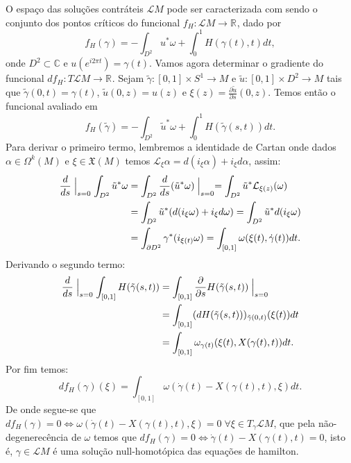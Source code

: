 \documentclass[12pt]{book}
\newcommand{\derivadaparcial}[2]{\frac{\partial #1}{\partial #2}}
\newcommand{\real}[1]{\mathbb{R}^{#1}}
\newcommand{\solucoesperiodicascontrateis}{\mathcal{L}M}
\begin{document}
	O espaço das soluções contráteis $\solucoesperiodicascontrateis$ pode ser caracterizada com sendo o conjunto dos pontos críticos do funcional $f_{H}:\solucoesperiodicascontrateis \to \real{}$, dado por
	$$
	f_{H}(\gamma) = -\int_{D^{2}}u^{*}\omega + \int_{0}^{1}H(\gamma(t), t)dt,
	$$
	onde $D^{2} \subset \mathbb{C}$ e $u(e^{i2\pi t}) = \gamma(t)$. Vamos agora determinar o gradiente do funcional $df_{H}: T\solucoesperiodicascontrateis \to \real{}$. Sejam $\tilde{\gamma}:[0,1] \times S^{1} \to M$  e $\tilde{u}:[0,1] \times D^{2} \to M$ tais que $\tilde{\gamma}(0,t) = \gamma(t)$, $\tilde{u}(0,z) = u(z)$ e $\xi(z) = \derivadaparcial{\tilde{u}}{s}(0,z)$. Temos então o funcional avaliado em
	$$
	f_{H}(\tilde{\gamma}) = -\int_{D^{2}}\tilde{u}^{*}\omega + \int_{0}^{1}H(\tilde{\gamma}(s,t))dt.
	$$
	Para derivar o primeiro termo, lembremos a identidade de Cartan onde dados $\alpha \in \Omega^{k}(M)$ e $\xi \in \mathfrak{X}(M)$ temos $\mathcal{L}_{\xi}\alpha = d(i_{\xi}\alpha) + i_{\xi}d\alpha$, assim:
	$$
	\begin{aligned}
	\frac{d}{ds} \Bigm\lvert_{s=0} \int_{D^{2}}\tilde{u}^{*}\omega &=\int_{D^{2}}\frac{d}{ds} (\tilde{u}^{*}\omega)\Bigm\lvert_{s=0}  =\int_{D^{2}}\tilde{u}^{*} \mathcal{L}_{\xi(z)}(\omega)
	\\
	&=\int_{D^{2}}\tilde{u}^{*} (d(i_{\xi}\omega) + i_{\xi}d\omega) =\int_{D^{2}}\tilde{u}^{*} d(i_{\xi}\omega)
	\\
	&=\int_{\partial D^{2}}	\gamma^{*} (i_{\xi(t)}\omega) = \int_{[0,1]} \omega(\xi(t), \dot{\gamma}(t))dt.
	\end{aligned}
	$$
	Derivando o segundo termo:
	$$
	\begin{aligned}
	\frac{d}{ds} \Bigm\lvert_{s=0} \int_{[0,1]} H(\tilde{\gamma}(s,t)) 
	&= \int_{[0,1]} \derivadaparcial{}{s} H(\tilde{\gamma}(s,t)) \Bigm\lvert_{s=0}
	\\
	&= \int_{[0,1]} (dH(\tilde{\gamma}(s,t)))_{\tilde{\gamma}(0,t)}(\xi(t))dt
	\\
	&= \int_{[0,1]} \omega_{\gamma(t)}(\xi(t), X(\gamma(t), t))dt. 
	\end{aligned}
	$$
	Por fim temos:
	$$
	df_{H}(\gamma)(\xi) = \int_{[0,1]} \omega(\dot{\gamma}(t) - X(\gamma(t), t), \xi)dt.
	$$
	De onde segue-se que $df_{H}(\gamma) = 0 \iff \omega(\dot{\gamma}(t) - X(\gamma(t), t), \xi)=0\; \forall \xi \in T_{\gamma}\solucoesperiodicascontrateis$, que pela não-degenerecência de $\omega$ temos que $df_{H}(\gamma) = 0 \iff \dot{\gamma}(t) - X(\gamma(t), t)=0$, isto é, $\gamma \in \solucoesperiodicascontrateis$ é uma solução null-homotópica das equações de hamilton.
	
\end{document}
